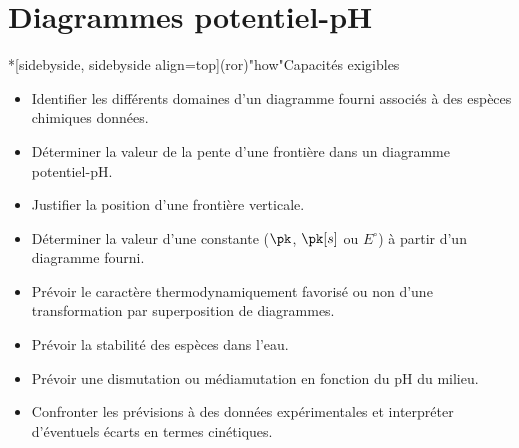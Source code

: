 \documentclass[../../main/main.tex]{subfiles}
\begin{document}
\setcounter{chapter}{6}


\chapter{Diagrammes potentiel-pH}

\vspace*{\fill}

\minitoc

\vspace*{\fill}
\begin{tcb}*[sidebyside, sidebyside align=top](ror)"how"{Capacités exigibles}
  \small
		\begin{itemize}[label=\rcheck]
			\item Identifier les différents domaines d'un diagramme fourni associés à
			      des espèces chimiques données.
			\item Déterminer la valeur de la pente d'une frontière dans un diagramme
			      potentiel-pH.
			\item Justifier la position d'une frontière verticale.
			\item Déterminer la valeur d'une constante ($\pk$, $\pk[s]$ ou $E^\circ$)
			      à partir d'un diagramme fourni.
		\end{itemize}
    \tcblower
		\begin{itemize}[label=\rcheck]
			\item Prévoir le caractère thermodynamiquement favorisé ou non d'une
			      transformation par superposition de diagrammes.
			\item Prévoir la stabilité des espèces dans l'eau.
			\item Prévoir une dismutation ou médiamutation en fonction du pH du milieu.
			\item Confronter les prévisions à des données expérimentales et
			      interpréter d'éventuels écarts en termes cinétiques.
		\end{itemize}
	\end{tcb}
\end{document}
